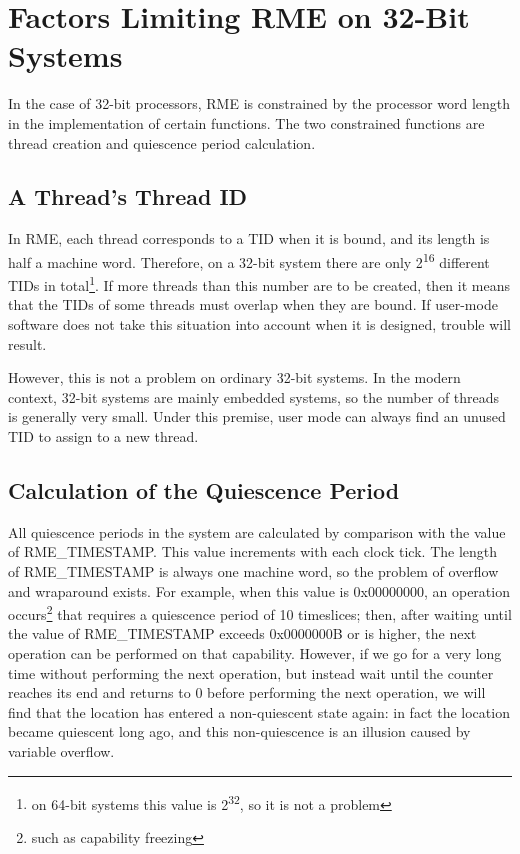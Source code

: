 \section{Factors Limiting RME on 32-Bit Systems}\label{sec:9-32bit-limitations}

In the case of 32-bit processors, RME is constrained by the processor word length in the implementation of certain functions. The two constrained functions are thread creation and quiescence period calculation.

\subsection{A Thread's Thread ID}\label{subsec:9-thread-id}

In RME, each thread corresponds to a TID when it is bound, and its length is half a machine word. Therefore, on a 32-bit system there are only 2\textsuperscript{16} different TIDs in total\footnote{on 64-bit systems this value is 2\textsuperscript{32}, so it is not a problem}. If more threads than this number are to be created, then it means that the TIDs of some threads must overlap when they are bound. If user-mode software does not take this situation into account when it is designed, trouble will result.

However, this is not a problem on ordinary 32-bit systems. In the modern context, 32-bit systems are mainly embedded systems, so the number of threads is generally very small. Under this premise, user mode can always find an unused TID to assign to a new thread.

\subsection{Calculation of the Quiescence Period}\label{subsec:9-quiescence-time}

All quiescence periods in the system are calculated by comparison with the value of RME\_TIMESTAMP. This value increments with each clock tick. The length of RME\_TIMESTAMP is always one machine word, so the problem of overflow and wraparound exists.
For example, when this value is 0x00000000, an operation occurs\footnote{such as capability freezing} that requires a quiescence period of 10 timeslices; then, after waiting until the value of RME\_TIMESTAMP exceeds 0x0000000B or is higher, the next operation can be performed on that capability. However, if we go for a very long time without performing the next operation, but instead wait until the counter reaches its end and returns to 0 before performing the next operation, we will find that the location has entered a non-quiescent state again: in fact the location became quiescent long ago, and this non-quiescence is an illusion caused by variable overflow.


